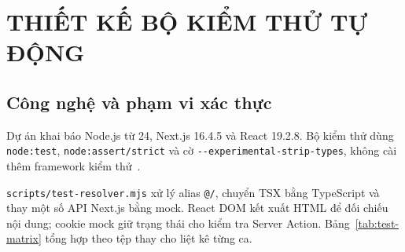 \documentclass[12pt,a4paper]{extarticle}
\begin{document}
\clearpage
\section{THIẾT KẾ BỘ KIỂM THỬ TỰ ĐỘNG}
\subsection{Công nghệ và phạm vi xác thực}
Dự án khai báo Node.js từ 24, Next.js 16.4.5 và React 19.2.8. Bộ kiểm thử dùng \texttt{node:test}, \texttt{node:assert/strict} và cờ \nolinkurl{--experimental-strip-types}, không cài thêm framework kiểm thử~\cite{nodejs-test}.

\nolinkurl{scripts/test-resolver.mjs} xử lý alias \texttt{@/}, chuyển TSX bằng TypeScript và thay một số API Next.js bằng mock. React DOM kết xuất HTML để đối chiếu nội dung; cookie mock giữ trạng thái cho kiểm tra Server Action. Bảng~\ref{tab:test-matrix} tổng hợp theo tệp thay cho liệt kê từng ca.
\end{document}
